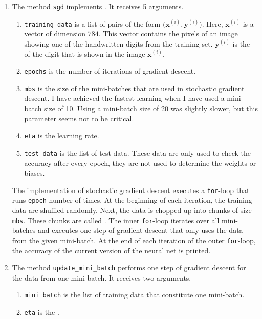 \begin{enumerate}
\item The method \texttt{sgd} implements .   It receives 5 arguments.
      \begin{enumerate}
      \item \texttt{training\_data} is a list of pairs of the form $\bigl(\mathbf{x}^{(i)}, \mathbf{y}^{(i)}\bigr)$.
            Here, $\mathbf{x}^{(i)}$ is a vector of dimension $784$.  This vector contains the pixels of an image showing
            one of the handwritten digits from the training set.  $\mathbf{y}^{(i)}$ is the  of the digit
            that is shown in the image $\mathbf{x}^{(i)}$.
      \item \texttt{epochs} is the number of iterations of gradient descent.      
      \item \texttt{mbs} is the size of the mini-batches that are used in stochastic gradient descent.
            I have achieved the fastest learning when I have used a mini-batch size of 10.  Using a mini-batch size
            of 20 was slightly slower, but this parameter seems not to be critical.
      \item \texttt{eta} is the learning rate.
      \item \texttt{test\_data} is the list of test data.  These data are only used to check the accuracy after
            every epoch, they are not used to determine the weights or biases.
      \end{enumerate}
      The implementation of stochastic gradient descent executes a \texttt{for}-loop that runs \texttt{epoch} number
      of times.  At the beginning of each iteration, the training data are shuffled randomly.  Next, the data is
      chopped up into chunks of size \texttt{mbs}.  These chunks are called .  The inner
      \texttt{for}-loop iterates over all mini-batches and executes one step of gradient descent that only uses the
      data from the given mini-batch.  At the end of each iteration of the outer \texttt{for}-loop, the accuracy of the
      current version of the neural net is printed.
\item The method \texttt{update\_mini\_batch} performs one step of gradient descent for the data from one mini-batch.
      It receives two arguments.
      \begin{enumerate}
      \item \texttt{mini\_batch} is the list of training data that constitute one mini-batch.
      \item \texttt{eta} is the .

\end{enumerate}
\end{enumerate}
